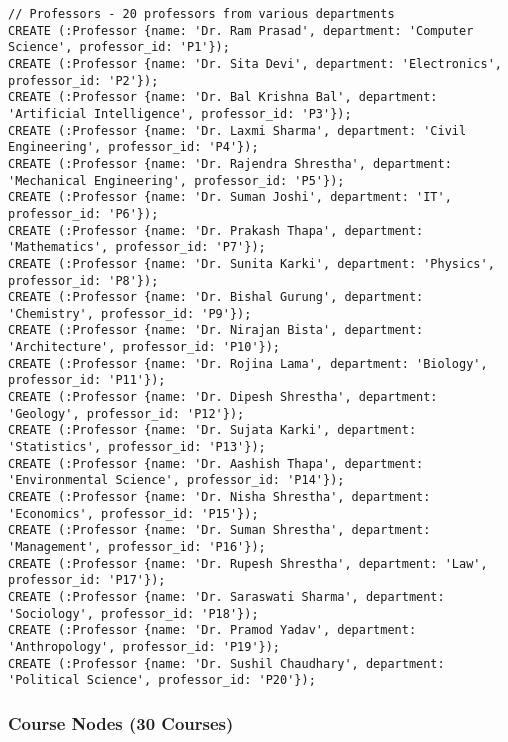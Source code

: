 \begin{verbatim}
// Professors - 20 professors from various departments
CREATE (:Professor {name: 'Dr. Ram Prasad', department: 'Computer Science', professor_id: 'P1'});
CREATE (:Professor {name: 'Dr. Sita Devi', department: 'Electronics', professor_id: 'P2'});
CREATE (:Professor {name: 'Dr. Bal Krishna Bal', department: 'Artificial Intelligence', professor_id: 'P3'});
CREATE (:Professor {name: 'Dr. Laxmi Sharma', department: 'Civil Engineering', professor_id: 'P4'});
CREATE (:Professor {name: 'Dr. Rajendra Shrestha', department: 'Mechanical Engineering', professor_id: 'P5'});
CREATE (:Professor {name: 'Dr. Suman Joshi', department: 'IT', professor_id: 'P6'});
CREATE (:Professor {name: 'Dr. Prakash Thapa', department: 'Mathematics', professor_id: 'P7'});
CREATE (:Professor {name: 'Dr. Sunita Karki', department: 'Physics', professor_id: 'P8'});
CREATE (:Professor {name: 'Dr. Bishal Gurung', department: 'Chemistry', professor_id: 'P9'});
CREATE (:Professor {name: 'Dr. Nirajan Bista', department: 'Architecture', professor_id: 'P10'});
CREATE (:Professor {name: 'Dr. Rojina Lama', department: 'Biology', professor_id: 'P11'});
CREATE (:Professor {name: 'Dr. Dipesh Shrestha', department: 'Geology', professor_id: 'P12'});
CREATE (:Professor {name: 'Dr. Sujata Karki', department: 'Statistics', professor_id: 'P13'});
CREATE (:Professor {name: 'Dr. Aashish Thapa', department: 'Environmental Science', professor_id: 'P14'});
CREATE (:Professor {name: 'Dr. Nisha Shrestha', department: 'Economics', professor_id: 'P15'});
CREATE (:Professor {name: 'Dr. Suman Shrestha', department: 'Management', professor_id: 'P16'});
CREATE (:Professor {name: 'Dr. Rupesh Shrestha', department: 'Law', professor_id: 'P17'});
CREATE (:Professor {name: 'Dr. Saraswati Sharma', department: 'Sociology', professor_id: 'P18'});
CREATE (:Professor {name: 'Dr. Pramod Yadav', department: 'Anthropology', professor_id: 'P19'});
CREATE (:Professor {name: 'Dr. Sushil Chaudhary', department: 'Political Science', professor_id: 'P20'});
\end{verbatim}

\subsubsection{Course Nodes (30 Courses)}


